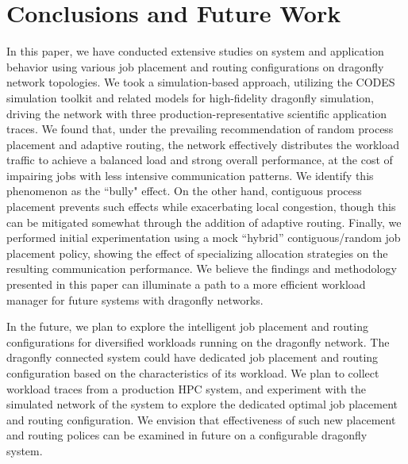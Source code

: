 \section{Conclusions and Future Work}
\label{sec:conclusion}

In this paper, we have conducted extensive studies on system and application behavior using various job placement and routing configurations on dragonfly network topologies. We took a simulation-based approach, utilizing the CODES simulation toolkit and related models for high-fidelity dragonfly simulation, driving the network with three production-representative scientific application traces. We found that, under the prevailing recommendation of random process placement and adaptive routing, the network effectively distributes the workload traffic to achieve a balanced load and strong overall performance, at the cost of impairing jobs with less intensive communication patterns. We identify this phenomenon as the ``bully" effect. On the other hand, contiguous process placement prevents such effects while exacerbating local congestion, though this can be mitigated somewhat through the addition of adaptive routing. Finally, we performed initial experimentation using a mock ``hybrid'' contiguous/random job placement policy, showing the effect of specializing allocation strategies on the resulting communication performance.
We believe the findings and methodology presented in this paper can illuminate a path to a more efficient workload manager for future systems with dragonfly networks. 

In the future, we plan to explore the intelligent job placement and routing configurations for diversified workloads running on the dragonfly network. The dragonfly connected system could have dedicated job placement and routing configuration based on the characteristics of its workload. We plan to collect workload traces from a production HPC system, and experiment with the simulated network of the system to explore the dedicated optimal job placement and routing configuration. We envision that effectiveness of such new placement and routing polices can be examined in future on a configurable dragonfly system. 

